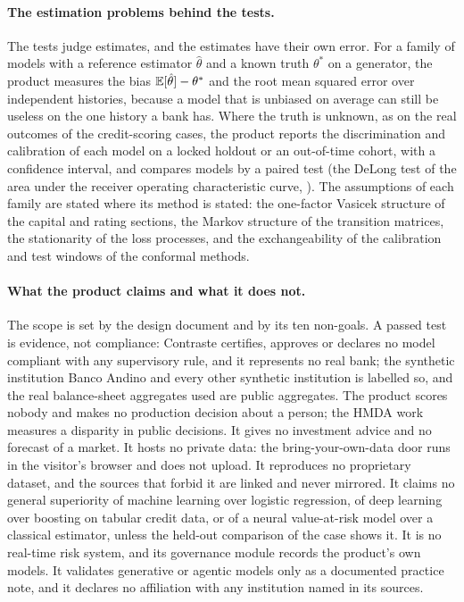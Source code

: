 \paragraph{The estimation problems behind the tests.} The tests judge estimates, and the estimates have their own error. For a family of models with a
reference estimator $\hat\theta$ and a known truth $\theta^\ast$ on a generator, the product measures the bias $\mathbb{E}[\hat\theta]-\theta^\ast$ and the root mean squared
error over independent histories, because a model that is unbiased on average can still be useless on the one history a bank has. Where the truth is unknown, as on the real
outcomes of the credit-scoring cases, the product reports the discrimination and calibration of each model on a locked holdout or an out-of-time cohort, with a
confidence interval, and compares models by a paired test (the DeLong test of the area under the receiver operating characteristic curve, \citealt{credit-scoring:delong1988}).
The assumptions of each family are stated where its method is stated: the one-factor Vasicek structure of the capital and rating sections, the Markov structure of
the transition matrices, the stationarity of the loss processes, and the exchangeability of the calibration and test windows of the conformal methods.

\paragraph{What the product claims and what it does not.} The scope is set by the design document and by its ten non-goals. A passed test is evidence, not
compliance: Contraste certifies, approves or declares no model compliant with any supervisory rule, and it represents no real bank; the synthetic institution
Banco Andino and every other synthetic institution is labelled so, and the real balance-sheet aggregates used are public aggregates. The product scores
nobody and makes no production decision about a person; the HMDA work measures a disparity in public decisions. It gives no investment advice and no forecast of
a market. It hosts no private data: the bring-your-own-data door runs in the visitor's browser and does not upload. It reproduces no proprietary dataset, and the sources
that forbid it are linked and never mirrored. It claims no general superiority of machine learning over logistic regression, of deep learning over boosting on tabular credit
data, or of a neural value-at-risk model over a classical estimator, unless the held-out comparison of the case shows it. It is no real-time risk system, and its governance
module records the product's own models. It validates generative or agentic models only as a documented practice note, and it declares no affiliation with any institution named in its sources.

